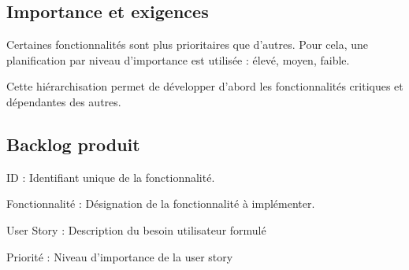 \documentclass[12pt,a4paper]{report}
\begin{document}
\subsection{Importance et exigences}

Certaines fonctionnalités sont plus prioritaires que d’autres. Pour cela, une planification par niveau d’importance est utilisée : élevé, moyen, faible.

Cette hiérarchisation permet de développer d’abord les fonctionnalités critiques et dépendantes des autres.

\subsection{Backlog produit}
\item ID : Identifiant unique de la fonctionnalité.
\item Fonctionnalité : Désignation de la fonctionnalité à implémenter.
\item User Story : Description du besoin utilisateur formulé 
\item Priorité : Niveau d’importance de la user story
\end{document}
